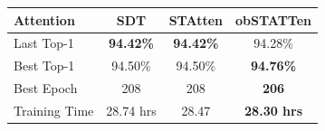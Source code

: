 \documentclass[../main.tex]{subfiles}
\begin{document}
\begin{tabular}{lccc}\toprule

Attention &SDT &STAtten &obSTATTen\\\midrule

Last Top-1	& \textbf{94.42\%}	& \textbf{94.42\%}	&94.28\%\\
Best Top-1	& 94.50\%	& 94.50\%	& \textbf{94.76\%} \\
Best Epoch	& 208		& 208		& \textbf{206}	   \\
Training Time & 28.74 hrs & 28.47 & \textbf{28.30 hrs}  \\\bottomrule

\end{tabular}
\end{document}
